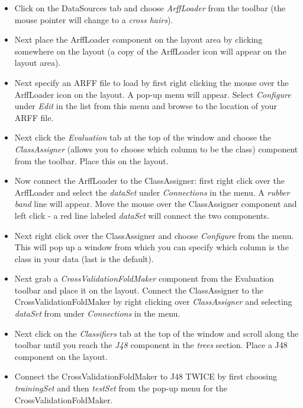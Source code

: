 \documentclass[a4paper]{article}
\begin{document}
\begin{itemize}
	\item Click on the DataSources tab and choose \textit{ArffLoader} from the
	toolbar (the mouse pointer will change to a \textit{cross hairs}).

	\item Next place the ArffLoader component on the layout area by clicking
	somewhere on the layout (a copy of the ArffLoader icon will appear on
	the layout area).

	\item Next specify an ARFF file to load by first right clicking the mouse
	over the ArffLoader icon on the layout. A pop-up menu will
	appear. Select \textit{Configure} under \textit{Edit} in the list from this menu and
	browse to the location of your ARFF file.

	\item Next click the \textit{Evaluation} tab at the top of the window and choose the
	\textit{ClassAssigner} (allows you to choose which column to be the class)
	component from the toolbar. Place this on the layout.

	\item Now connect the ArffLoader to the ClassAssigner: first right click
	over the ArffLoader and select the \textit{dataSet} under \textit{Connections} in
	the menu. A \textit{rubber band} line will appear. Move the mouse over the
	ClassAssigner component and left click - a red line labeled \textit{dataSet}
	will connect the two components.

	\item Next right click over the ClassAssigner and choose \textit{Configure} from
	the menu. This will pop up a window from which you can specify which
	column is the class in your data (last is the default).

	\item Next grab a \textit{CrossValidationFoldMaker} component from the Evaluation
	toolbar and place it on the layout. Connect the ClassAssigner to the
	CrossValidationFoldMaker by right clicking over \textit{ClassAssigner} and
	selecting \textit{dataSet} from under \textit{Connections} in the menu.

	\item Next click on the \textit{Classifiers} tab at the top of the window and
	scroll along the toolbar until you reach the \textit{J48} component in the
	\textit{trees} section. Place a J48 component on the layout.

	\item Connect the CrossValidationFoldMaker to J48 TWICE by first choosing
	\textit{trainingSet} and then \textit{testSet} from the pop-up menu for the
	CrossValidationFoldMaker.


\end{itemize}
\end{document}
